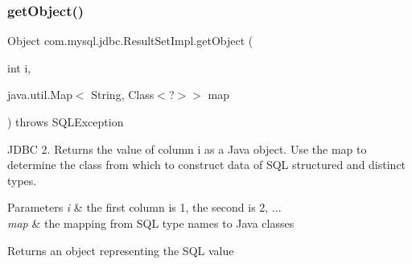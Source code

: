 \subsubsection{\texorpdfstring{get\+Object()}{getObject()}\hspace{0.1cm}{\footnotesize\ttfamily [2/4]}}
{\footnotesize\ttfamily Object com.\+mysql.\+jdbc.\+Result\+Set\+Impl.\+get\+Object (\begin{DoxyParamCaption}\item[{int}]{i,  }\item[{java.\+util.\+Map$<$ String, Class$<$?$>$$>$}]{map }\end{DoxyParamCaption}) throws S\+Q\+L\+Exception}

J\+D\+BC 2. Returns the value of column i as a Java object. Use the map to determine the class from which to construct data of S\+QL structured and distinct types.


\begin{DoxyParams}{Parameters}
{\em i} & the first column is 1, the second is 2, ... \\
\hline
{\em map} & the mapping from S\+QL type names to Java classes\\
\hline
\end{DoxyParams}
\begin{DoxyReturn}{Returns}
an object representing the S\+QL value
\end{DoxyReturn}

